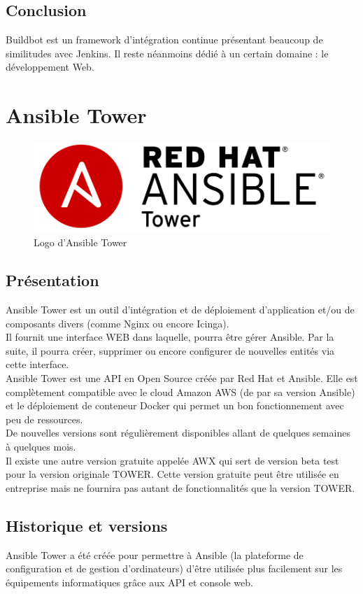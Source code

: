 \documentclass[12pt]{article}
\begin{document}
\subsection{Conclusion}
Buildbot est un framework d'intégration continue présentant beaucoup de similitudes avec Jenkins. Il reste néanmoins dédié à un certain domaine : le développement Web.

\section{Ansible Tower}

\begin{figure}[ht]
    \includegraphics[scale=0.4]{images/ansible_tower.png}
    \caption{Logo d'Ansible Tower}
\end{figure}

\subsection{Présentation}
Ansible Tower est un outil d'intégration et de déploiement d'application et/ou de composants divers (comme Nginx ou encore Icinga). 
\\
Il fournit une interface WEB dans laquelle, pourra être gérer Ansible. Par la suite, il pourra créer, supprimer ou encore configurer de nouvelles entités via cette interface.
\\
Ansible Tower est une API en Open Source créée par Red Hat et Ansible. Elle est complètement compatible avec le cloud Amazon AWS (de par sa version Ansible) et le déploiement de conteneur Docker qui permet un bon fonctionnement avec peu de ressources.
\\
De nouvelles versions sont régulièrement disponibles allant de quelques semaines à quelques mois.
\\
Il existe une autre version gratuite appelée AWX qui sert de version beta test pour la version originale TOWER. Cette version gratuite peut être utilisée en entreprise mais ne fournira pas autant de fonctionnalités que la version TOWER.

\subsection{Historique et versions}
Ansible Tower a été créée pour permettre à Ansible (la plateforme de configuration et de gestion d’ordinateurs) d’être utilisée plus facilement sur les équipements informatiques grâce aux API et console web.
\end{document}
